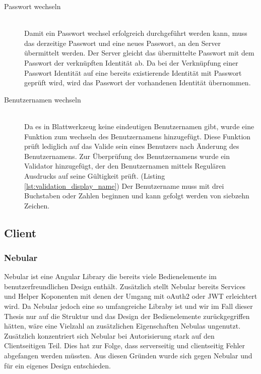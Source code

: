 \begin{description}
	\item[Passwort wechseln]\hfill\\
	Damit ein Passwort wechsel erfolgreich durchgeführt werden kann, muss das derzeitige Passwort und eine neues Passwort, an den Server übermittelt werden. Der Server gleicht das übermittelte Passwort mit dem Passwort der verknüpften Identität ab. Da bei der Verknüpfung einer Passwort Identität auf eine bereits existierende Identität mit Passwort geprüft wird, wird das Passwort der vorhandenen Identität übernommen. 
	
	\item[Benutzernamen wechseln]\hfill\\
	Da es in Blattwerkzeug keine eindeutigen Benutzernamen gibt, wurde eine Funktion zum wechseln des Benutzernamens hinzugefügt. Diese Funktion prüft lediglich auf das Valide sein eines Benutzers nach Änderung des Benutzernamens. Zur Überprüfung des Benutzernamens wurde ein Validator hinzugefügt, der den Benutzernamen mittels Regulären Ausdrucks auf seine Gültigkeit prüft. (Listing \ref{lst:validation_display_name}) Der Benutzername muss mit drei Buchstaben oder Zahlen beginnen und kann gefolgt werden von siebzehn Zeichen. 
\end{description}




\subsection{Client}
\label{sec: client}

\subsubsection{Nebular}
\label{sec: nebular}
Nebular ist eine Angular Library die bereits viele Bedienelemente im benutzerfreundlichen Design enthält. Zusätzlich stellt Nebular bereits Services und Helper Koponenten mit denen der Umgang mit \gls{oAuth2} oder \gls{JWT} erleichtert wird. Da Nebular jedoch eine so umfangreiche Libraby ist und wir im Fall dieser Thesis nur auf die Struktur und das Design der Bedienelemente zurückgegriffen hätten, wäre eine Vielzahl an zusätzlichen Eigenschaften Nebulas ungenutzt. Zusätzlich konzentriert sich Nebular bei Autorisierung stark auf den Clientseitigen Teil. Dies hat zur Folge, dass serverseitig und clientseitig Fehler abgefangen werden müssten. Aus diesen Gründen wurde sich gegen Nebular und für ein eigenes Design entschieden.


